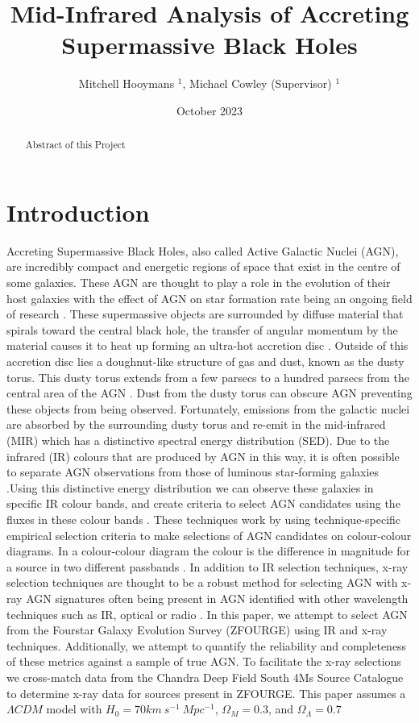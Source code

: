 \documentclass[11pt]{iopart}
\date{October 2023}
\begin{document}
\title{Mid-Infrared Analysis of Accreting Supermassive Black Holes}
\author{Mitchell Hooymans $^1$, Michael Cowley (Supervisor) $^1$}
\address{$^1$ Queensland University of Technology, Brisbane, Australia, 4000}

\begin{abstract}
    Abstract of this Project
\end{abstract}

\ioptwocol
\section{Introduction}
Accreting Supermassive Black Holes, also called Active Galactic Nuclei (AGN), are incredibly compact and energetic regions of space that exist in the centre of some galaxies. These AGN are thought to play a role in the evolution of their host galaxies with the effect of AGN on star formation rate being an ongoing field of research \cite{cowley_zfourge_2016}. These supermassive objects are surrounded by diffuse material that spirals toward the central black hole, the transfer of angular momentum by the material causes it to heat up forming an ultra-hot accretion disc \cite{shakura_black_1973}. Outside of this accretion disc lies a doughnut-like structure of gas and dust, known as the dusty torus. This dusty torus extends from a few parsecs to a hundred parsecs from the central area of the AGN \cite{netzer_revisiting_2015}. Dust from the dusty torus can obscure AGN preventing these objects from being observed. Fortunately, emissions from the galactic nuclei are absorbed by the surrounding dusty torus and re-emit in the mid-infrared (MIR) which has a distinctive spectral energy distribution (SED)\cite{lyu_polar_2018}. Due to the infrared (IR) colours that are produced by AGN in this way, it is often possible to separate AGN observations from those of luminous star-forming galaxies \cite{hickox_obscured_2018}.Using this distinctive energy distribution we can observe these galaxies in specific IR colour bands, and create criteria to select AGN candidates using the fluxes in these colour bands \cite{lacy_obscured_2004, stern_midinfrared_2005, donley_identifying_2012, messias_new_2012}. These techniques work by using technique-specific empirical selection criteria to make selections of AGN candidates on colour-colour diagrams. In a colour-colour diagram the colour is the difference in magnitude for a source in two different passbands \cite{bessell_ubvri_1990}. In addition to IR selection techniques, x-ray selection techniques are thought to be a robust method for selecting AGN with x-ray AGN signatures often being present in AGN identified with other wavelength techniques such as IR, optical or radio \cite{brandt_cosmic_2015}. In this paper, we attempt to select AGN from the Fourstar Galaxy Evolution Survey (ZFOURGE) \cite{straatman_fourstar_2016} using IR and x-ray techniques. Additionally, we attempt to quantify the reliability and completeness of these metrics against a sample of true AGN. To facilitate the x-ray selections we cross-match data from the Chandra Deep Field South 4Ms Source Catalogue \cite{xue_chandra_2011} to determine x-ray data for sources present in ZFOURGE. This paper assumes a $\Lambda CDM$ model with $H_0 = 70 km \ s^{-1} \ Mpc^{-1}$, $\Omega_M = 0.3$, and $\Omega_{\Lambda} = 0.7$ 
\end{document}
